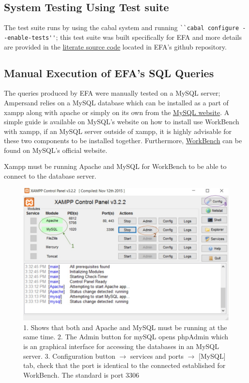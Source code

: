 \subsection{System Testing Using Test suite}
The test suite runs by using the cabal system and running 
\verb|``cabal configure --enable-tests''|; this test suite was built 
specifically for EFA and 
more details are provided in the 
\href{https://github.com/4ZP6Capstone2015/ampersand/blob/master/src/Database/Design/Ampersand/ECA2SQL/FreshName.lhs}{literate
 source code} located in EFA's github repository.

\subsection{Manual Execution of EFA's SQL Queries}

The queries produced by EFA were manually tested on a MySQL server; Ampersand 
relies on a MySQL database which can be installed as a part of xampp along with 
apache or simply on its own from the 
\href{https://dev.mysql.com/downloads/mysql/}{MySQL website}. A simple guide is 
available on MySQL's website on how to install use WorkBench with xampp, if an 
MySQL server outside of xampp, it is highly advisable for these two components 
to be installed together. Furthermore, 
\href{https://dev.mysql.com/downloads/workbench/}{WorkBench} can be found on 
MySQL's official website.

Xampp must be running Apache and MySQL for WorkBench to be able to connect to 
the database server. 
\begin{figure}[!h]
    \includegraphics[width=\textwidth]{images/xampp}
    \caption{\footnotesize{1. Shows that both and Apache and MySQL must be 
    running at the same time. 2. The Admin button for mySQL opens phpAdmin 
    which is an graphical interface for accessing the databases in an MySQL 
    server. 3. Configuration button $\rightarrow$ services and ports 
    $\rightarrow$ [MySQL] tab, check that the port is identical to the 
    connected established for WorkBench. The standard is port 3306 }}
\end{figure}

